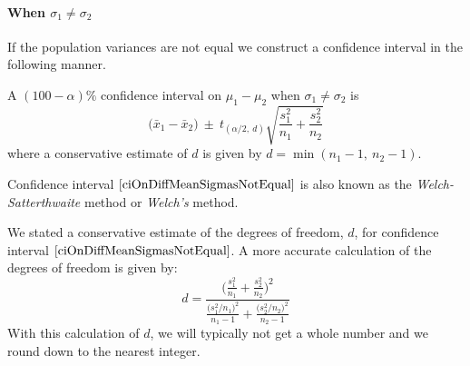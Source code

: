 \paragraph{When $\sigma_{1} \neq \sigma_{2}$}
\noindent
If the population variances are not equal we construct 
a confidence interval in the following manner.



\begin{ci}
\label{ciOnDiffMeanSigmasNotEqual}
A $(100 - \alpha)\%$ confidence interval on $\mu_{1} - \mu_{2}$ when $\sigma_{1} \neq \sigma_{2}$
is
\begin{equation}\label{eqnCITwoSampleSigmasUnknownUnequal}
\big(\bar{x}_{1}	 - \bar{x}_{2}\big)	~\pm~		t_{(\alpha / 2, ~d)} 
\sqrt{ \displaystyle\frac{s_{1}^{2} }{ n_{1} }  +  \frac{s_{2}^{2} }{ n_{2}  }  }
\end{equation}
where a conservative estimate of $d$ is given by $d = \min(n_{1} - 1, ~n_{2} - 1)$.
\end{ci}

\noindent
{}
Confidence interval $\ref{ciOnDiffMeanSigmasNotEqual}$ 
is also known as the \textit{Welch-Satterthwaite} method or \textit{Welch's} method.

\begin{nt}
We stated a conservative estimate of the degrees of freedom, $d$,
for confidence interval $\ref{ciOnDiffMeanSigmasNotEqual}$. 
A more accurate calculation of the degrees of freedom is given by:
	\begin{equation}
	d = 	\displaystyle\frac{  \bigg( \displaystyle\frac{ s_{1}^2 }{ n_{1} } + \frac{ s_{2}^2 }{ n_{2} } \bigg)^{2}  }{
		\displaystyle\frac{ \big(  s_{1}^{2} / n_{1}  \big)^{2}  }{ n_{1} - 1}
		+
		\displaystyle\frac{ \big( s_{2}^{2} / n_{2 } \big)^{2}  }{n_{2} - 1}
		}
	\end{equation}
With this calculation of $d$, we will typically not get a whole number and we round down to the nearest integer.
\end{nt}

